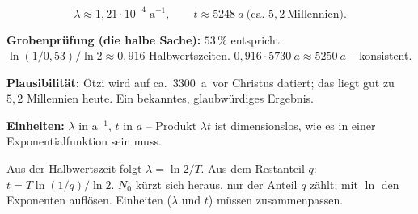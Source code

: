 \begin{ergebnis}
\begin{equation*}
  \lambda\approx 1{,}21\cdot10^{-4}\;\mathrm{a^{-1}},\qquad
  t\approx \qty{5248}{a}\ \text{(ca. }5{,}2\ \text{Millennien)} .
\end{equation*}
\end{ergebnis}

\begin{kontrolle}
\textbf{Grobenprüfung (die halbe Sache):} $53\,\%$ entspricht
$\ln(1/0{,}53)/\ln 2\approx0{,}916$ Halbwertszeiten. $0{,}916\cdot\qty{5730}{a}
\approx\qty{5250}{a}$ -- konsistent. \checkmark

\textbf{Plausibilität:} Ötzi wird auf ca.\ \qty{3300}{a}\ vor Christus
datiert; das liegt gut zu $5{,}2$ Millennien heute. Ein bekanntes,
glaubwürdiges Ergebnis. \checkmark

\textbf{Einheiten:} $\lambda$ in $\mathrm{a^{-1}}$, $t$ in $\unit{a}$ --
Produkt $\lambda t$ ist dimensionslos, wie es in einer Exponentialfunktion
sein muss. \checkmark
\end{kontrolle}

\begin{merksatz}
Aus der Halbwertszeit folgt $\lambda=\ln 2/T$. Aus dem Restanteil $q$:
$t=T\ln(1/q)/\ln 2$. $N_0$ kürzt sich heraus, nur der Anteil $q$ zählt;
mit $\ln$ den Exponenten auflösen. Einheiten ($\lambda$ und $t$) müssen
zusammenpassen.
\end{merksatz}
